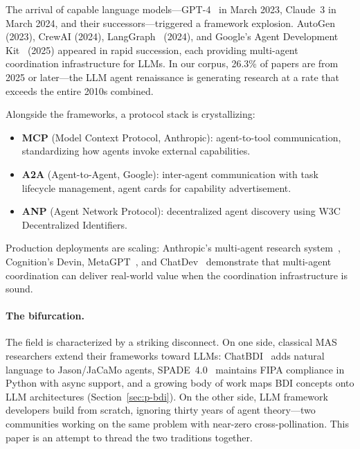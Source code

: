 \documentclass{article}
\begin{document}
%
%
%
%
%
%

The arrival of capable language models---GPT-4~\citep{openai2023gpt4} in March 2023,
Claude~3 in March 2024, and their successors---triggered a framework explosion.
AutoGen~\citep{wu2023autogen} (2023), CrewAI (2024), LangGraph~\citep{langgraph2024}
(2024), and Google's Agent Development Kit~\citep{googleadk2025} (2025) appeared in rapid
succession, each providing multi-agent coordination infrastructure for LLMs. In our
corpus, 26.3\% of papers are from 2025 or later---the LLM agent renaissance is
generating research at a rate that exceeds the entire 2010s combined.

Alongside the frameworks, a protocol stack is crystallizing:
\begin{itemize}[nosep]
  \item \textbf{MCP} (Model Context Protocol, Anthropic): agent-to-tool communication,
    standardizing how agents invoke external capabilities.
  \item \textbf{A2A} (Agent-to-Agent, Google): inter-agent communication with task
    lifecycle management, agent cards for capability advertisement.
  \item \textbf{ANP} (Agent Network Protocol): decentralized agent discovery using W3C
    Decentralized Identifiers.
\end{itemize}
Production deployments are scaling: Anthropic's multi-agent research
system~\citep{anthropic2025building}, Cognition's Devin, MetaGPT~\citep{hong2024metagpt},
and ChatDev~\citep{qian2024chatdev} demonstrate that multi-agent coordination can deliver
real-world value when the coordination infrastructure is sound.

\paragraph{The bifurcation.}
The field is characterized by a striking disconnect. On one side, classical MAS
researchers extend their frameworks toward LLMs: ChatBDI~\citep{chatbdi2025} adds
natural language to Jason/JaCaMo agents, SPADE~4.0~\citep{palanca2020spade} maintains
FIPA compliance in Python with async support, and a growing body of work maps BDI
concepts onto LLM architectures (Section~\ref{sec:p-bdi}). On the other side, LLM
framework developers build from scratch, ignoring thirty years of agent theory---two
communities working on the same problem with near-zero cross-pollination. This paper
is an attempt to thread the two traditions together.
\end{document}
